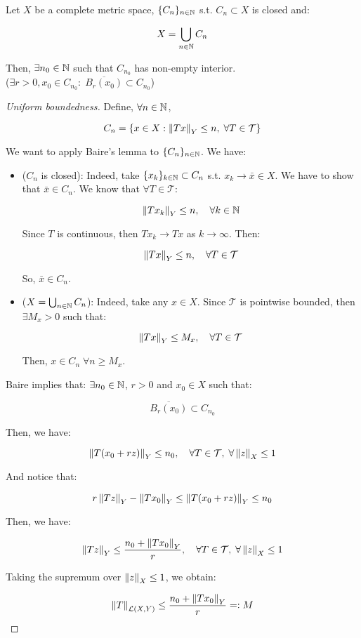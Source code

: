 \begin{flemma}
    Let $X$ be a complete metric space, $\{C_n\}_{n \in \mathbb{N}}$ s.t.
    $C_n \subset X$ is closed and:

    $$X = \bigcup_{n \in \mathbb{N}} C_n$$

    Then, $\exists n_0 \in \mathbb{N}$ such that $C_{n_0}$ has non-empty interior.\\

    ($\exists r > 0, x_0 \in C_{n_0}: \; \overline{B_r(x_0)} \subset C_{n_0}$)
\end{flemma}

\begin{proof}[Uniform boundedness]
    Define, $\forall n \in \mathbb{N}$, 

    $$C_n = \{x \in X: \left\|Tx\right\|_Y \leq n, \; \forall T \in \mathcal{T}\}$$

    We want to apply Baire's lemma to $\{C_n\}_{n \in \mathbb{N}}$. We have:

    \begin{itemize}
        \item ($C_n$ is closed): Indeed, take $\{x_k\}_{k \in \mathbb{N}} \subset C_n$ s.t. $x_k \to \bar{x} \in X$.
        We have to show that $\bar{x} \in C_n$. We know that $\forall T \in \mathcal{T}$:

        $$\left\|Tx_k\right\|_Y \leq n, \quad \forall k \in \mathbb{N}$$

        Since $T$ is continuous, then $Tx_k \to Tx$ as $k \to \infty$. Then:

        $$\left\|Tx\right\|_Y \leq n, \quad \forall T \in \mathcal{T}$$

        So, $\bar{x} \in C_n$.

        \item ($X = \bigcup_{n \in \mathbb{N}} C_n$): Indeed, take any $x \in X$. 
        Since $\mathcal{T}$ is pointwise bounded, then $\exists M_x > 0$ such that:

        $$\left\|Tx\right\|_Y \leq M_x, \quad \forall T \in \mathcal{T}$$

        Then, $x \in C_{n} \; \forall n \geq M_x$.
    \end{itemize}

    Baire implies that: $\exists n_0 \in \mathbb{N}$, $r > 0$ and $x_0 \in X$ such that:

    $$\overline{B_r(x_0)} \subset C_{n_0}$$

    Then, we have:

    $$\left\|T(x_0 + r z)\right\|_Y \leq n_0, \quad \forall T \in \mathcal{T}, \; \forall \left\|z\right\|_X \leq 1$$

    And notice that:

    $$r \left\|Tz\right\|_Y - \left\|T x_0\right\|_Y \leq \left\|T(x_0 + r z)\right\|_Y \leq n_0$$

    Then, we have:

    $$\left\|Tz\right\|_Y \leq \frac{n_0 + \left\|T x_0\right\|_Y}{r}, \quad \forall T \in \mathcal{T}, \; \forall \left\|z\right\|_X \leq 1$$

    Taking the supremum over $\left\|z\right\|_X \leq 1$, we obtain:

    $$\left\|T\right\|_{\mathcal{L}(X, Y)} \leq \frac{n_0 + \left\|T x_0\right\|_Y}{r} =: M$$

\end{proof}

